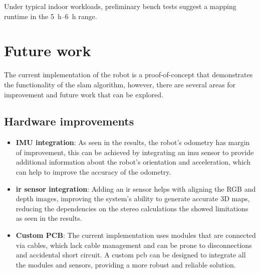 Under typical indoor workloads, preliminary bench tests suggest a mapping runtime in the \SIrange{5}{6}{\hour} range.




\chapter{Future work}\label{ch:future_work}

The current implementation of the robot is a proof-of-concept that demonstrates the functionality of the \gls{slam} algorithm, however, there are several areas for improvement and future work that can be explored.

\section{Hardware improvements}

\begin{itemize}
  \item \textbf{IMU integration}: As seen in the results, the robot's odometry has margin of improvement, this can be achieved by integrating an \gls{imu} sensor to provide additional information about the robot's orientation and acceleration, which can help to improve the accuracy of the odometry.
  \item \textbf{\gls{ir} sensor integration}: Adding an \gls{ir} sensor helps with aligning the RGB and depth images, improving the system's ability to generate accurate 3D maps, reducing the dependencies on the stereo calculations the showed limitations as seen in the results. 
  \item \textbf{Custom PCB}: The current implementation uses modules that are connected via cables, which lack cable management and can be prone to disconnections and accidental short circuit. A custom \gls{pcb} can be designed to integrate all the modules and sensors, providing a more robust and reliable solution.
\end{itemize}
